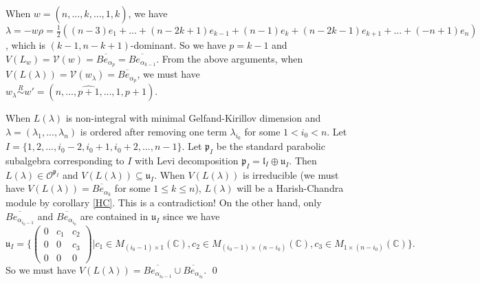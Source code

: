\documentclass{amsart}[12pt]
\newtheorem{Rem}{Remark}[section]
\def\fuu{\mathfrak{u}}
\renewcommand{\subset}{\subseteq}
\numberwithin{equation}{section}
\begin{document}
When  $w=(n,...,\hat{k},...,1,k)$, we have $\lambda=-w\rho=\frac{1}{2}((n-3)e_1+...+(n-2k+1)e_{k-1}+(n-1)e_k+(n-2k-1)e_{k+1}+...+(-n+1)e_n)$, which is $(k-1,n-k+1)$-dominant. So we have $p=k-1$ and $V(L_w)=\mathcal{V}(w)=\overline{Be_{\alpha_{p}}}=\overline{Be_{\alpha_{k-1}}}$.
From the above arguments, when  $V(L(\lambda))=\mathcal{V}(w_{\lambda})=\overline{Be_{\alpha_{p}}}$, we must have $w_{\lambda}\stackrel{R}{\sim} w'=(n,...,{\widehat{p+1}},...,1,p+1)$.

When $L(\lambda)$ is non-integral with minimal Gelfand-Kirillov dimension and $\lambda=(\lambda_1,...,\lambda_n)$ is ordered after removing one term $\lambda_{i_0}$ for some $1<i_0<n$. Let $I=\{1,2,...,i_0-2,i_0+1,i_0+2,...,n-1\}$. Let $\mathfrak{p}_I$ be the standard parabolic subalgebra corresponding to $I$ with Levi decomposition $\mathfrak{p}_I=\mathfrak{l}_I\oplus \mathfrak{u}_I$.
Then $L(\lambda)\in \mathscr{O}^{\mathfrak{p}_{I}}$ and $V(L(\lambda))\subset \fuu_I$. When $V(L(\lambda))$ is irreducible (we must have $V(L(\lambda))=\overline{Be_{\alpha_{k}}}$ for some $1\leq k\leq n$), $L(\lambda)$ will be a Harish-Chandra module by corollary \ref{HC}. This is a contradiction! On the other hand, only
$\overline{Be_{\alpha_{i_0-1}}}$ and $\overline{Be_{\alpha_{i_0}}}$ are contained in $\mathfrak{u}_I$ since we have $$\mathfrak{u}_I=\{\left(
\begin{array}{ccc}
0 & c_1& c_2 \\
0 & 0&c_3 \\
0&0&0
\end{array}
\right)|c_1\in M_{(i_0-1)\times 1}(\mathbb{C}), c_2\in M_{(i_0-1)\times (n-i_0)}(\mathbb{C}), c_3\in M_{1\times (n-i_0)}(\mathbb{C})\}.$$
So we must have $V(L(\lambda))=\overline{Be_{\alpha_{i_0-1}}}\cup \overline{Be_{\alpha_{i_0}}}$.
                                                     \qed
\end{document}
